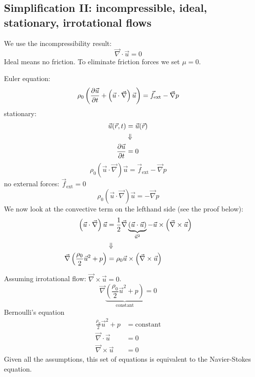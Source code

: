 \subsection{Simplification II: incompressible, ideal, stationary, irrotational flows}
We use the incompressibility result:
\begin{equation}
\vec{\nabla}\cdot\vec{u} = 0
\end{equation}
Ideal means no friction. To eliminate friction forces we set $\mu=0$.

Euler equation:
\begin{equation}
\rho_0\left(\frac{\partial \vec{u}}{\partial t}+\left(\vec{u}\cdot\vec{\nabla}\right)\vec{u}\right) = \vec{f} _\mathrm{ext}-\vec{\nabla}p
\end{equation}
stationary:
\begin{align}
\vec{u}(\vec{r},t) &= \vec{u}(\vec{r})\\
&\Downarrow\notag\\
\frac{\partial \vec{u}}{\partial t} &= 0
\end{align}
\begin{equation}
\rho_0\left(\vec{u}\cdot\vec{\nabla}\right)\vec{u} = \vec{f} _\mathrm{ext}-\vec{\nabla}p
\end{equation}
no external forces: $\vec{f} _\mathrm{ext}=0$
\begin{equation}
\rho_0\left(\vec{u}\cdot\vec{\nabla}\right)\vec{u} = -\vec{\nabla}p
\end{equation}
We now look at the convective term on the lefthand side (see the proof below):
\begin{align}
\left(\vec{u}\cdot\vec{\nabla}\right)\vec{u} &= \frac{1}{2}\vec{\nabla}\underbrace{\left(\vec{u}\cdot\vec{u}\right)}_{\vec{u}^2}- \vec{u}\times\left(\vec{\nabla}\times\vec{u}\right)\\
&\Downarrow\notag\\
\vec{\nabla}\left(\frac{\rho_0}{2}\vec{u}^2+p\right) &= \rho_0\vec{u}\times\left(\vec{\nabla}\times\vec{u}\right)
\end{align}

Assuming irrotational flow: $\vec{\nabla}\times\vec{u}=0$.
\begin{equation}
\vec{\nabla}\underbrace{\left(\frac{\rho_0}{2}\vec{u}^2+p\right)}_\mathrm{constant}=0
\end{equation}
Bernoulli's equation
\begin{align}
\frac{\rho_0}{2}\vec{u}^2+p &= \mathrm{constant}\\
\vec{\nabla}\cdot\vec{u} &= 0\\
\vec{\nabla}\times\vec{u} &= 0
\end{align}
Given all the assumptions, this set of equations is equivalent to the Navier-Stokes equation.

